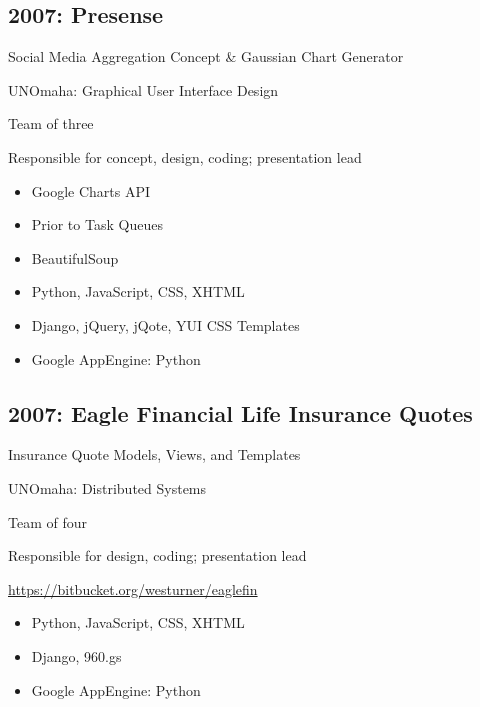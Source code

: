 \documentclass[letter,,openany,oneside]{sphinxhowto}
\begin{document}
\subsection{2007: Presense}
\label{resume:presense}
\begin{DUlineblock}{0em}
\item[] Social Media Aggregation Concept \& Gaussian Chart Generator
\item[] UNOmaha: Graphical User Interface Design
\item[] Team of three
\item[] Responsible for concept, design, coding; presentation lead
\end{DUlineblock}
\begin{itemize}
\item {} 
Google Charts API

\item {} 
Prior to Task Queues

\item {} 
BeautifulSoup

\item {} 
Python, JavaScript, CSS, XHTML

\item {} 
Django, jQuery, jQote, YUI CSS Templates

\item {} 
Google AppEngine: Python

\end{itemize}


\subsection{2007: Eagle Financial Life Insurance Quotes}
\label{resume:eagle-financial-life-insurance-quotes}
\begin{DUlineblock}{0em}
\item[] Insurance Quote Models, Views, and Templates
\item[] UNOmaha: Distributed Systems
\item[] Team of four
\item[] Responsible for design, coding; presentation lead
\item[] \href{https://bitbucket.org/westurner/eaglefin}{https://bitbucket.org/westurner/eaglefin}
\end{DUlineblock}
\begin{itemize}
\item {} 
Python, JavaScript, CSS, XHTML

\item {} 
Django, 960.gs

\item {} 
Google AppEngine: Python

\end{itemize}
\end{document}
